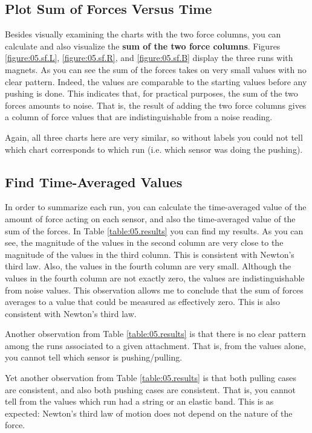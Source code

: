 \subsection{Plot Sum of Forces Versus Time}
%
Besides visually examining the charts with the two force columns, you can calculate and also visualize the \textbf{sum of the two force columns}. Figures \ref{figure:05.sf.L}, \ref{figure:05.sf.R}, and \ref{figure:05.sf.B} display the three runs with magnets. As you can see the sum of the forces takes on very small values with no clear pattern. Indeed, the values are comparable to the starting values before any pushing is done. This indicates that, for practical purposes, the sum of the two forces amounts to noise. That is, the result of adding the two force columns gives a column of force values that are indistinguishable from a noise reading.

Again, all three charts here are very similar, so without labels you could not tell which chart corresponds to which run (i.e. which sensor was doing the pushing).
%
\subsection{Find Time-Averaged Values}
%
In order to summarize each run, you can calculate the time-averaged value of the amount of force acting on each sensor, and also the time-averaged value of the sum of the forces. In Table \ref{table:05.results} you can find my results. As you can see, the magnitude of the values in the second column are very close to the magnitude of the values in the third column. This is consistent with Newton's third law. Also, the values in the fourth column are very small. Although the values in the fourth column are not exactly zero, the values are indistinguishable from noise values. This observation allows me to conclude that the sum of forces averages to a value that could be measured as effectively zero. This is also consistent with Newton's third law.

Another observation from Table \ref{table:05.results} is that there is no clear pattern among the runs associated to a given attachment. That is, from the values alone, you cannot tell which sensor is pushing/pulling.

Yet another observation from Table \ref{table:05.results} is that both pulling cases are consistent, and also both pushing cases are consistent. That is, you cannot tell from the values which run had a string or an elastic band. This is as expected: Newton's third law of motion does not depend on the nature of the force.
%
